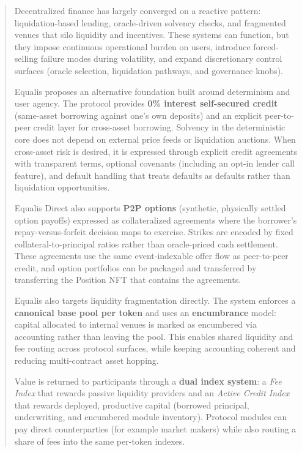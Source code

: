 \documentclass[version=preprint]{iacrcc}
\begin{document}
\begin{abstract}
Decentralized finance has largely converged on a reactive pattern: liquidation-based lending, oracle-driven solvency checks, and fragmented venues that silo liquidity and incentives. These systems can function, but they impose continuous operational burden on users, introduce forced-selling failure modes during volatility, and expand discretionary control surfaces (oracle selection, liquidation pathways, and governance knobs).

Equalis proposes an alternative foundation built around determinism and user agency. The protocol provides \textbf{0\% interest self-secured credit} (same-asset borrowing against one’s own deposits) and an explicit peer-to-peer credit layer for cross-asset borrowing. Solvency in the deterministic core does not depend on external price feeds or liquidation auctions. When cross-asset risk is desired, it is expressed through explicit credit agreements with transparent terms, optional covenants (including an opt-in lender call feature), and default handling that treats defaults as defaults rather than liquidation opportunities.

Equalis Direct also supports \textbf{P2P options} (synthetic, physically settled option payoffs) expressed as collateralized agreements where the borrower’s repay-versus-forfeit decision maps to exercise. Strikes are encoded by fixed collateral-to-principal ratios rather than oracle-priced cash settlement. These agreements use the same event-indexable offer flow as peer-to-peer credit, and option portfolios can be packaged and transferred by transferring the Position NFT that contains the agreements.

Equalis also targets liquidity fragmentation directly. The system enforces a \textbf{canonical base pool per token} and uses an \textbf{encumbrance} model: capital allocated to internal venues is marked as encumbered via accounting rather than leaving the pool. This enables shared liquidity and fee routing across protocol surfaces, while keeping accounting coherent and reducing multi-contract asset hopping.

Value is returned to participants through a \textbf{dual index system}: a \textit{Fee Index} that rewards passive liquidity providers and an \textit{Active Credit Index} that rewards deployed, productive capital (borrowed principal, underwriting, and encumbered module inventory). Protocol modules can pay direct counterparties (for example market makers) while also routing a share of fees into the same per-token indexes.


\end{abstract}
\end{document}
